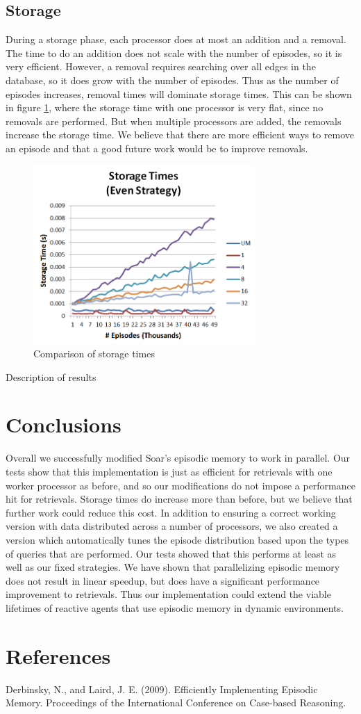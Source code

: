 \documentclass[11pt]{article} %
\begin{document}
\subsection{Storage}

During a storage phase, each processor does at most an addition and a removal. The time
to do an addition does not scale with the number of episodes, so it is very efficient. However, 
a removal requires searching over all edges in the database, so it does grow with the number of 
episodes. Thus as the number of episodes increases, removal times will dominate storage times. 
This can be shown in figure \ref{fig:storage}, where the storage time with one processor is very flat, since
no removals are performed. But when multiple processors are added, the removals increase the
storage time. We believe that there are more efficient ways to remove an episode and that a 
good future work would be to improve removals. 

\begin{figure}[h]
\caption{Comparison of storage times}\label{fig:storage}
\centering
\includegraphics[width=0.75\textwidth]{images/storage_even}
\end{figure}

Description of results


\section{Conclusions}
Overall we successfully modified Soar's episodic memory to work in parallel. Our tests show that this implementation 
is just as efficient for retrievals with one worker processor as before, and so our modifications do not impose a performance hit
for retrievals. Storage times do increase more than before, but we believe that further work could reduce this cost. 
In addition to ensuring a correct working version with data distributed across a number of processors, we also 
created a version which automatically tunes the episode distribution based upon the types of queries that are performed. 
Our tests showed that this performs at least as well as our fixed strategies. We have shown that parallelizing episodic memory
does not result in linear speedup, but does have a significant performance improvement to retrievals. Thus our implementation
could extend the viable lifetimes of reactive agents that use episodic memory in dynamic environments. 

\section{References}

Derbinsky, N., and Laird, J. E. (2009). Efficiently Implementing Episodic
Memory. Proceedings of the International Conference on Case-based Reasoning.
\end{document}
